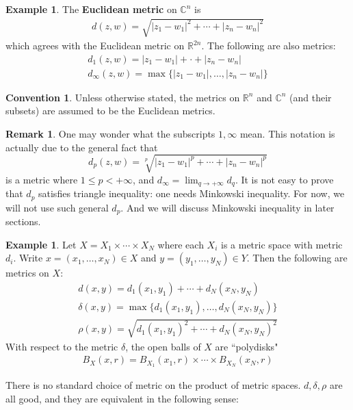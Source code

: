 \documentclass[12pt,b5paper,notitlepage]{article}
\theoremstyle{definition}
\newtheorem{eg}[df]{Example}
\newtheorem{rem}[df]{Remark}
\newtheorem{cv}[df]{Convention}
\theoremstyle{plain}
\newcommand{\Cbb}{\mathbb C}
\newcommand{\Rbb}{\mathbb R}
\numberwithin{equation}{section}
\begin{document}
\begin{eg}
The \textbf{Euclidean metric} on $\Cbb^n$ is
\begin{align*}
d(z,w)=\sqrt{|z_1-w_1|^2+\cdots+|z_n-w_n|^2}
\end{align*}
which agrees with the Euclidean metric on $\Rbb^{2n}$. The following are also metrics:
\begin{gather*}
d_1(z,w)=|z_1-w_1|+\cdot+|z_n-w_n|\\
d_\infty(z,w)=\max\{|z_1-w_1|,\dots,|z_n-w_n|\}
\end{gather*}
\end{eg}

\begin{cv}\label{lb33}
Unless otherwise stated, the metrics on $\Rbb^n$ and $\Cbb^n$ (and their subsets) are assumed to be the Euclidean metrics.
\end{cv}


\begin{rem}
One may wonder what the subscripts $1,\infty$ mean. This notation is actually due to the general fact that
\begin{equation*}
d_p(z,w)=\sqrt[p]{|z_1-w_1|^p+\cdots+|z_n-w_n|^p}
\end{equation*}
is a metric where $1\leq p< +\infty$, and $d_\infty=\lim_{q\rightarrow +\infty}d_q$. It is not easy to prove that $d_p$ satisfies triangle inequality: one needs Minkowski inequality. For now, we will not use such general $d_p$. And we will discuss Minkowski inequality in later sections.
\end{rem}


\begin{eg}\label{lb19}
Let $X=X_1\times\cdots\times X_N$ where each $X_i$ is a metric space with metric $d_i$. Write $x=(x_1,\dots,x_N)\in X$ and $y=(y_1,\dots,y_N)\in Y$. Then the following are metrics on $X$:
\begin{gather*}
d(x,y)=d_1(x_1,y_1)+\cdots+d_N(x_N,y_N)\\
\delta(x,y)=\max\{d_1(x_1,y_1),\dots,d_N(x_N,y_N)\}\\
\rho(x,y)=\sqrt{d_1(x_1,y_1)^2+\cdots+d_N(x_N,y_N)^2}
\end{gather*}
With respect to the metric $\delta$, the open balls of $X$ are ``polydisks"
\begin{align*}
B_X(x,r)=B_{X_1}(x_1,r)\times\cdots\times B_{X_N}(x_N,r)
\end{align*}
\end{eg}


There is no standard choice of metric on the product of metric spaces. $d,\delta,\rho$ are all good, and they are equivalent in the following sense:
\end{document}
